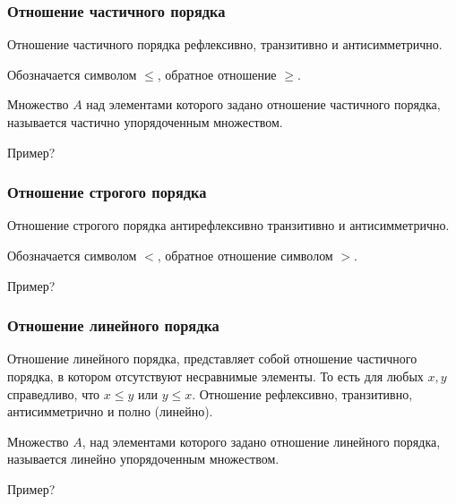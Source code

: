 \begin{frame}
    \frametitle{Отношение частичного порядка}
    
    \begin{definition}
        Отношение \alert{частичного} порядка рефлексивно, транзитивно и антисимметрично. 
    \end{definition}
    
    Обозначается символом $\leq$, обратное отношение $\geq$. 
    
    \begin{definition}
        Множество $A$ над элементами которого задано отношение частичного порядка, называется \alert{частично упорядоченным множеством}. 
    \end{definition}
    
    Пример?
\end{frame}    

\begin{frame}
    \frametitle{Отношение строгого порядка}
    
    \begin{definition}
        Отношение \alert{строгого} порядка антирефлексивно транзитивно и антисимметрично. 
    \end{definition}
    
    Обозначается символом $<$, обратное отношение символом $>$.
    
    Пример?
\end{frame}    
    
\begin{frame}
    \frametitle{Отношение линейного порядка}
    
    \begin{definition}
        Отношение \alert{линейного} порядка, представляет собой отношение частичного порядка, в котором отсутствуют несравнимые элементы. То есть для любых $x,y$ справедливо, что $x\leq y$ или $y\leq x$. Отношение рефлексивно, транзитивно, антисимметрично и \alert{полно} (линейно). 
    \end{definition}
    
    Множество $A$, над элементами которого задано отношение линейного порядка, называется \alert{линейно упорядоченным множеством}. 
    
    Пример?
\end{frame}    

